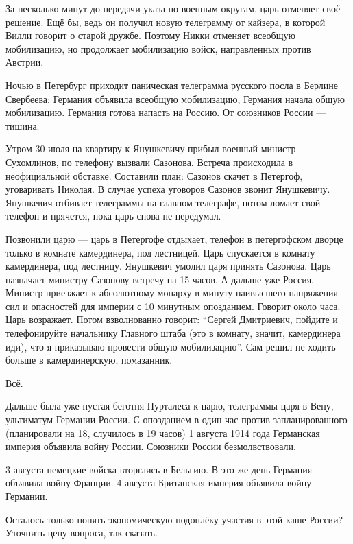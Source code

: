 За несколько минут до передачи указа по военным округам, царь отменяет своё
решение. Ещё бы, ведь он получил новую телеграмму от кайзера, в которой Вилли
говорит о старой дружбе. Поэтому Никки отменяет всеобщую мобилизацию, но
продолжает мобилизацию войск, направленных против Австрии.

Ночью в Петербург приходит паническая телеграмма русского посла в Берлине
Свербеева: Германия объявила всеобщую мобилизацию, Германия начала общую
мобилизацию. Германия готова напасть на Россию. От союзников России --- тишина.

Утром 30 июля на квартиру к Янушкевичу прибыл военный министр Сухомлинов, по
телефону вызвали Сазонова. Встреча происходила в неофициальной обставке.
Составили план: Сазонов скачет в Петергоф, уговаривать Николая. В случае успеха
уговоров Сазонов звонит Янушкевичу. Янушкевич отбивает телеграммы на главном
телеграфе, потом ломает свой телефон и прячется, пока царь снова не передумал.

Позвонили царю --- царь в Петергофе отдыхает, телефон в петергофском дворце
только в комнате камердинера, под лестницей. Царь спускается в комнату
камердинера, под лестницу. Янушкевич умолил царя принять Сазонова. Царь
назначает министру Сазонову встречу на 15 часов. А дальше уже Россия. Министр
приезжает к абсолютному монарху в минуту наивысшего напряжения сил и опасностей
для империи с 10 минутным опозданием. Говорит около часа. Царь возражает. Потом
взволнованно говорит: \enquote{Сергей Дмитриевич, пойдите и телефонируйте начальнику
Главного штаба (это в комнату, значит, камердинера иди), что я приказываю
провести общую мобилизацию}. Сам решил не ходить больше в камердинерскую,
помазанник.

Всё.

Дальше была уже пустая беготня Пурталеса к царю, телеграммы царя в Вену,
ультиматум Германии России. С опозданием в один час против запланированного
(планировали на 18, случилось в 19 часов) 1 августа 1914 года Германская империя
объявила войну России. Союзники России безмолвствовали.

3 августа немецкие войска вторглись в Бельгию. В это же день Германия объявила
войну Франции. 4 августа Британская империя объявила войну Германии.

Осталось только понять экономическую подоплёку участия в этой каше России?
Уточнить цену вопроса, так сказать.
